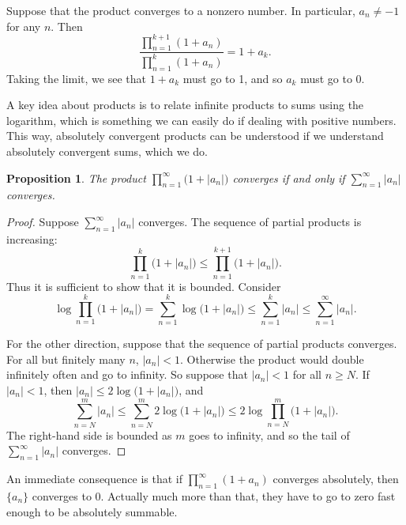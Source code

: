 \documentclass[12pt,openany]{book}
\newcommand{\sabs}[1]{\lvert {#1} \rvert}
\theoremstyle{plain}
\newtheorem{prop}[thm]{Proposition}
\theoremstyle{remark}
\theoremstyle{definition}
\theoremstyle{exercise}
\theoremstyle{example}
\begin{document}
Suppose that the product converges to a nonzero number.
In particular, $a_n \not= -1$ for any $n$.  Then
\begin{equation*}
\frac{
\prod_{n=1}^{k+1} (1+a_n)
}{
\prod_{n=1}^{k} (1+a_n)
}
=1+a_k .
\end{equation*}
Taking the limit, we see that $1+a_k$ must go to 1, and so $a_k$ must go to 0.

A key idea about products is to relate infinite products to sums using the
logarithm, which is something we can easily do if dealing with positive
numbers.  This way, absolutely convergent products can be understood
if we understand absolutely convergent sums, which we do.

\begin{prop} \label{prop:infprodabsconvinfsum}
The product $\prod_{n=1}^\infty \bigl(1+\sabs{a_n}\bigr)$ converges if and only if
$\sum_{n=1}^\infty \sabs{a_n}$ converges.
\end{prop}

\begin{proof}
Suppose $\sum_{n=1}^\infty \sabs{a_n}$ converges.
The sequence of partial products is increasing:
\begin{equation*}
\prod_{n=1}^k \bigl(1+\sabs{a_n}\bigr) \leq
\prod_{n=1}^{k+1} \bigl(1+\sabs{a_n}\bigr) .
\end{equation*}
Thus it is sufficient to show that it is bounded.
Consider
\begin{equation*}
\log \prod_{n=1}^k \bigl(1+\sabs{a_n}\bigr)
=
\sum_{n=1}^k \log \bigl(1+\sabs{a_n}\bigr)
\leq
\sum_{n=1}^k \sabs{a_n} \leq
\sum_{n=1}^\infty \sabs{a_n} .
\end{equation*}

For the other direction, suppose that the sequence of partial products
converges.  For all but finitely many $n$, $\sabs{a_n} < 1$.
Otherwise the product would double infinitely often and go to
infinity.  So suppose that $\sabs{a_n} < 1$ for all $n \geq N$.
If $\sabs{a_n} < 1$, then $\sabs{a_n} \leq 2 \log \bigl(1+\sabs{a_n}\bigr)$,
and
\begin{equation*}
\sum_{n=N}^m \sabs{a_n}
\leq
\sum_{n=N}^m 2 \log \bigl(1+\sabs{a_n}\bigr)
\leq
2 \log \prod_{n=N}^m \bigl(1+\sabs{a_n}\bigr) .
\end{equation*}
The right-hand side is bounded as $m$ goes to infinity, and so the tail of
$\sum_{n=1}^\infty \sabs{a_n}$ converges.
\end{proof}

An immediate consequence is that if 
$\prod_{n=1}^\infty (1+a_n)$ converges absolutely, then
$\{ a_n \}$ converges to $0$.  Actually much more than that, they have to
go to zero fast enough to be absolutely summable.
\end{document}
